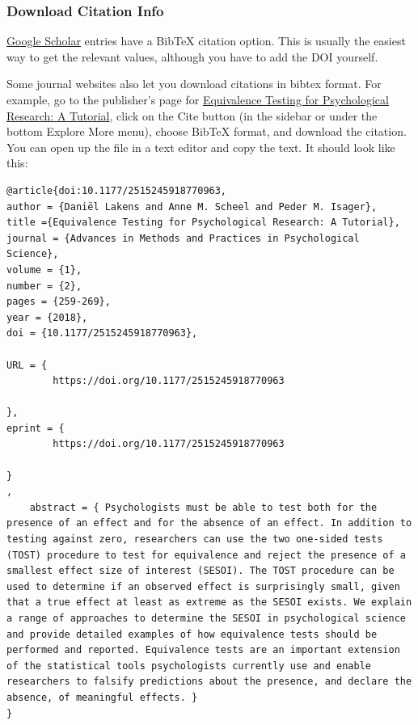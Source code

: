 \documentclass[
  oneside]{book}
\begin{document}
\hypertarget{download-citation-info}{%
\subsubsection{Download Citation Info}\label{download-citation-info}}

\href{https://scholar.google.com/}{Google Scholar} entries have a BibTeX citation option. This is usually the easiest way to get the relevant values, although you have to add the DOI yourself.

Some journal websites also let you download citations in bibtex format.
For example, go to the publisher's page for \href{https://journals.sagepub.com/doi/abs/10.1177/2515245918770963}{Equivalence Testing for Psychological Research: A Tutorial}, click on the Cite button (in the sidebar or under the bottom Explore More menu), choose BibTeX format, and download the citation. You can open up the file in a text editor and copy the text. It should look like this:

\begin{verbatim}
@article{doi:10.1177/2515245918770963,
author = {Daniël Lakens and Anne M. Scheel and Peder M. Isager},
title ={Equivalence Testing for Psychological Research: A Tutorial},
journal = {Advances in Methods and Practices in Psychological Science},
volume = {1},
number = {2},
pages = {259-269},
year = {2018},
doi = {10.1177/2515245918770963},

URL = { 
        https://doi.org/10.1177/2515245918770963
    
},
eprint = { 
        https://doi.org/10.1177/2515245918770963
    
}
,
    abstract = { Psychologists must be able to test both for the presence of an effect and for the absence of an effect. In addition to testing against zero, researchers can use the two one-sided tests (TOST) procedure to test for equivalence and reject the presence of a smallest effect size of interest (SESOI). The TOST procedure can be used to determine if an observed effect is surprisingly small, given that a true effect at least as extreme as the SESOI exists. We explain a range of approaches to determine the SESOI in psychological science and provide detailed examples of how equivalence tests should be performed and reported. Equivalence tests are an important extension of the statistical tools psychologists currently use and enable researchers to falsify predictions about the presence, and declare the absence, of meaningful effects. }
}
\end{verbatim}
\end{document}
